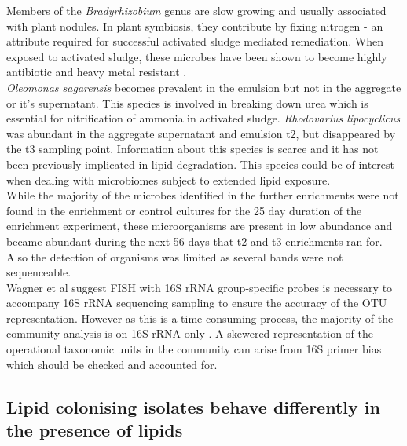 \documentclass[twoside]{article}
\begin{document}
Members of the \emph{Bradyrhizobium} genus are slow growing \cite{rebah2002wastewater} and usually associated with plant nodules. In plant symbiosis, they contribute by fixing nitrogen - an attribute required for successful activated sludge mediated remediation. When exposed to activated sludge, these microbes have been shown to become highly antibiotic and heavy metal resistant \cite{ahmad17samiullah}.\\


\emph{Oleomonas sagarensis} becomes prevalent in the emulsion but not in the aggregate or it's supernatant. This species is involved in breaking down urea \cite{kanamori2005allophanate,kanamori2004enzymatic} which is essential for nitrification of ammonia in activated sludge.
\emph{Rhodovarius lipocyclicus} was abundant in the aggregate supernatant and emulsion t2, but disappeared by the t3 sampling point. Information about this species is scarce \cite{kampfer2004rhodovarius} and it has not been previously implicated in lipid degradation. This species could be of interest when dealing with microbiomes subject to extended lipid exposure. \\

While the majority of the microbes identified in the further enrichments were not found in the enrichment or control cultures for the 25 day duration of the enrichment experiment, these microorganisms are present in low abundance and became abundant during the next 56 days that t2 and t3 enrichments ran for. Also the detection of organisms was limited as several bands were not sequenceable.\\




Wagner et al suggest FISH with 16S rRNA group-specific probes is necessary to accompany 16S rRNA sequencing sampling to ensure the accuracy of the OTU representation. However as this is a time consuming process, the majority of the community analysis is on 16S rRNA only \cite{Wagner_02} . A skewered representation of the operational taxonomic units in the community can arise from 16S primer bias which should be checked and accounted for.


\subsection{Lipid colonising isolates behave differently in the presence of lipids}
\end{document}
